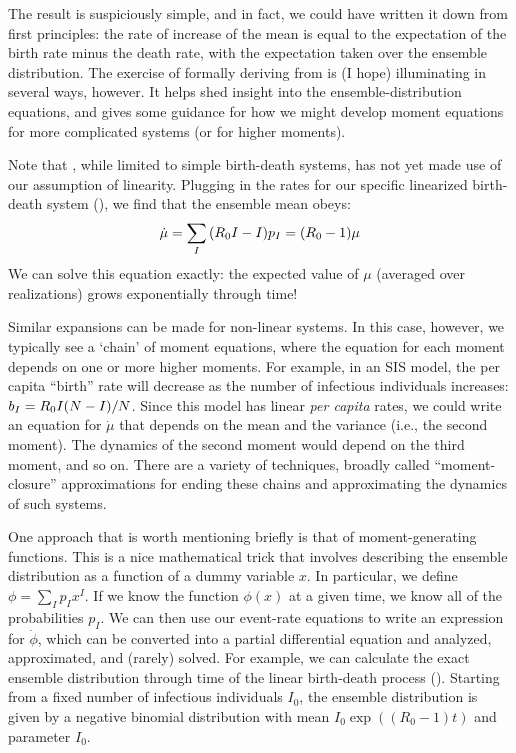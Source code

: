 \documentclass{amsproc}
\theoremstyle{definition}
\theoremstyle{remark}
\numberwithin{equation}{section}
\begin{document}
The result  is suspiciously simple, and in fact, we could have written it down from first principles: the rate of increase of the mean is equal to the expectation of the birth rate minus the death rate, with the expectation taken over the ensemble distribution.  The exercise of formally deriving  from  is (I hope) illuminating in several ways, however.  It helps shed insight into the ensemble-distribution equations, and gives some guidance for how we might develop moment equations for more complicated systems (or for higher moments).

Note that , while limited to simple birth-death systems, has not yet made use of our assumption of linearity.  Plugging in the rates for our specific linearized birth-death system (), we find that the ensemble mean obeys:
\begin{equation}
	\dot \mu =
		\sum_I{(\Ro I -I) p_I}
		= (\Ro-1)\mu
	\eqlab{mudot.lr}
\end{equation}
We can solve this equation exactly: the expected value of $\mu$ (averaged over realizations) grows exponentially through time! 

Similar expansions can be made for non-linear systems.  In this case, however, we typically see a `chain' of moment equations, where the equation for each moment depends on one or more higher moments.  For example, in an SIS model, the per capita ``birth'' rate will decrease as the number of infectious individuals increases: $b_I = R_0 I (N-I)/N$.  Since this model has linear {\em per capita} rates, we could write an equation for $\dot \mu$ that depends on the mean and the variance (i.e., the second moment).  The dynamics of the second moment would depend on the third moment, and so on.  There are a variety of techniques, broadly called ``moment-closure'' approximations for ending these chains and approximating the dynamics of such systems.

One approach that is worth mentioning briefly is that of moment-generating functions.  
This is a nice mathematical trick that involves describing the ensemble distribution as a function of a dummy variable $x$.
In particular, we define $\phi = \sum_I{p_Ix^I}$.
If we know the function $\phi(x)$ at a given time, we know all of the probabilities $p_I$.
We can then use our event-rate equations to write an expression for $\dot \phi$, which can be converted into a partial differential equation and analyzed, approximated, and (rarely) solved.
For example, we can calculate the exact ensemble distribution through time of the linear birth-death process (). 
Starting from a fixed number of infectious individuals $I_0$, the ensemble distribution is given by a negative binomial distribution with mean $I_0\exp((R_0-1)t)$ and parameter $I_0$.
\end{document}
